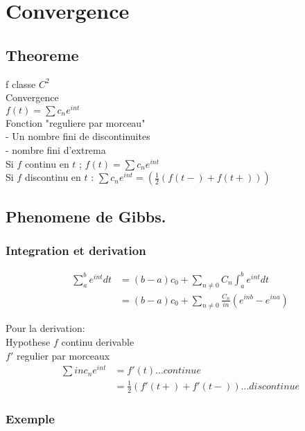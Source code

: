 \documentclass[a4paper,11pt]{article}
\begin{document}
\section{Convergence}

\subsection{Theoreme}
f  classe $C^2$\\
Convergence\\
$f(t) = \sum c_n e^{int}$\\

Fonction "reguliere par morceau"\\
- Un nombre fini de discontinuites\\
- nombre fini d'extrema\\

Si $f$ continu en $t$ ; $f(t) = \sum c_{n} e^{int}$\\
Si $f$ discontinu en $t$ : $\sum c_n e^{int} = (\frac{1}{2} (f(t-) + f(t+)))$\\

\subsection{Phenomene de Gibbs.}

\subsubsection{Integration et derivation}
\begin{align*}
 \sum_a^b e^{int} dt &= (b - a) c_0 + \sum_{n \neq 0} C_n \int_a^b e^{int} dt\\
 &= (b - a) c_0 + \sum_{n \neq 0 } \frac{C_n}{in} (e^{inb} - e^{ina}) 
\end{align*}

Pour la derivation:\\
Hypothese $f$ continu derivable\\
$f'$ regulier par morceaux\\
\begin{align*}
  \sum inc_n e^{int} &= f'(t) ... continue\\
&=\frac{1}{2} (f'(t+)+ f'(t-)) ... discontinue
\end{align*}

\subsubsection{Exemple}
\end{document}
